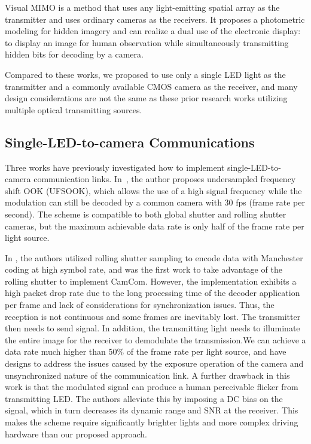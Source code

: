 Visual MIMO \cite{visualmimo1, visualmimo2, visualmimo3} is a method that uses any light-emitting spatial array as the transmitter and uses ordinary cameras as the receivers.
It proposes a photometric modeling for hidden imagery and can realize a dual use of the electronic display: to display an image for human observation while simultaneously transmitting hidden bits for decoding by a camera.

Compared to these works, we proposed to use only a single LED light as the transmitter and a commonly available CMOS camera as the receiver, and many design considerations are not the same as these prior research works utilizing multiple optical transmitting sources.

\subsection{Single-LED-to-camera Communications}
Three works \cite{roberts2013undersampled, danakis2012using,landmark} have previously investigated how to implement single-LED-to-camera communication links. 
In~\cite{roberts2013undersampled}, the author proposes undersampled frequency shift OOK (UFSOOK), which allows the use of a high signal frequency while the modulation can still be decoded by a common camera with 30 fps (frame rate per second). The scheme is compatible to both global shutter and rolling shutter cameras, but the maximum achievable data rate is only half of the frame rate per light source.

In \cite{danakis2012using}, the authors utilized rolling shutter sampling to encode data with Manchester coding at high symbol rate, and was the first work to take advantage of the rolling shutter to implement CamCom. 
However, the implementation exhibits a high packet drop rate due to the long processing time of the decoder application per frame and lack of considerations for synchronization issues. Thus, the reception is not continuous and some frames are inevitably lost. The transmitter then needs to send signal.
In addition, the transmitting light needs to illuminate the entire image for the receiver to demodulate the transmission.We can achieve a data rate much higher than 50\% of the frame rate per light source, and have designs to address the issues caused by the exposure operation of the camera and unsynchronized nature of the communication link.
A further drawback in this work is that the modulated signal can produce a human perceivable flicker from transmitting LED. The authors alleviate this by imposing a DC bias on the signal, which in turn decreases its dynamic range and SNR at the receiver. This makes the scheme require significantly brighter lights and more complex driving hardware than our proposed approach.

